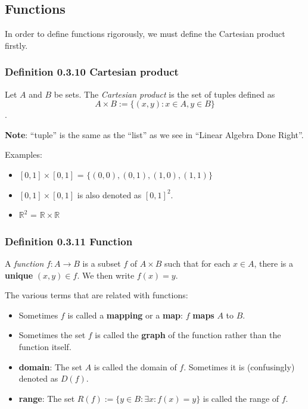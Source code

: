 \documentclass[12pt, letterpaper, oneside]{book}
\begin{document}
\subsection{Functions}

In order to define functions rigorously, we must define the Cartesian product
firstly.

\subsubsection{Definition 0.3.10 Cartesian product}

Let $A$ and $B$ be sets. The \textit{Cartesian product} is the set of tuples
defined as \[ A \times B := \{(x, y): x \in A, y \in B \} \].

\textbf{Note}: ``tuple'' is the same as the ``list'' as we see in ``Linear
Algebra Done Right''.

Examples:
\begin{itemize}
  \item $[0,1] \times [0,1]$ = $\{(0,0), (0,1), (1,0), (1,1)\}$
  \item $[0,1] \times [0,1]$ is also denoted as $[0,1]^2$.
  \item $\mathbb{R}^2$ = $\mathbb{R} \times \mathbb{R}$
\end{itemize}

\subsubsection{Definition 0.3.11 Function}

A \textit{function} $f: A \rightarrow B$ is a subset $f$ of $A \times B$ such
that for each $x \in A$, there is a \textbf{unique} $(x,y) \in f$. We then
write $f(x) = y$.

The various terms that are related with functions:
\begin{itemize}
  \item Sometimes $f$ is called a \textbf{mapping} or a \textbf{map}: $f$
    \textbf{maps} $A$ to $B$.
  \item Sometimes the set $f$ is called the \textbf{graph} of the function
    rather than the function itself.
  \item \textbf{domain}: The set $A$ is called the domain of $f$. Sometimes it
    is (confusingly) denoted as $D(f)$.
  \item \textbf{range}: The set $R(f) := \{y \in B: \exists x: f(x) = y\}$ is
    called the range of $f$.
\end{itemize}
\end{document}
